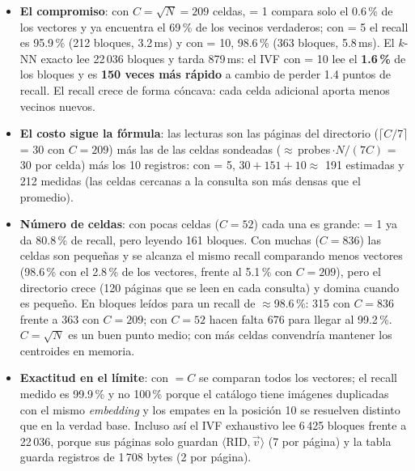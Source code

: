 \begin{itemize}
\item \textbf{El compromiso}: con $C=\sqrt N=209$ celdas,  = 1 compara solo el 0.6\,\%
  de los vectores y ya encuentra el 69\,\% de los vecinos verdaderos; con  = 5 el
  recall es 95.9\,\% (212 bloques, 3.2\,ms) y con  = 10, 98.6\,\% (363 bloques,
  5.8\,ms). El $k$-NN exacto lee 22\,036 bloques y tarda 879\,ms: el IVF con  = 10 lee
  el \textbf{1.6\,\%} de los bloques y es \textbf{150 veces más rápido} a cambio de perder 1.4 puntos
  de recall. El recall crece de forma cóncava: cada celda adicional aporta menos vecinos nuevos.
\item \textbf{El costo sigue la fórmula}: las lecturas son las páginas del directorio
  ($\lceil C/7\rceil$ = 30 con $C=209$) más las de las celdas sondeadas ($\approx$\,probes\,$\cdot
  N/(7C)$ = 30 por celda) más los 10 registros: con  = 5, $30+151+10\approx$ 191
  estimadas y 212 medidas (las celdas cercanas a la consulta son más densas que el promedio).
\item \textbf{Número de celdas}: con pocas celdas ($C=52$) cada una es grande:  = 1 ya
  da 80.8\,\% de recall, pero leyendo 161 bloques. Con muchas ($C=836$) las celdas son pequeñas y se
  alcanza el mismo recall comparando menos vectores (98.6\,\% con el 2.8\,\% de los vectores, frente
  al 5.1\,\% con $C=209$), pero el directorio crece (120 páginas que se leen en cada consulta) y
  domina cuando  es pequeño. En bloques leídos para un recall de $\approx$98.6\,\%:
  315 con $C=836$ frente a 363 con $C=209$; con $C=52$ hacen falta 676 para llegar al 99.2\,\%. $C=\sqrt N$ es un buen punto
  medio; con más celdas convendría mantener los centroides en memoria.
\item \textbf{Exactitud en el límite}: con  $=C$ se comparan todos los vectores; el
  recall medido es 99.9\,\% y no 100\,\% porque el catálogo tiene imágenes duplicadas con el mismo
  \emph{embedding} y los empates en la posición 10 se resuelven distinto que en la verdad base.
  Incluso así el IVF exhaustivo lee 6\,425 bloques frente a 22\,036, porque sus páginas solo guardan
  $\langle\text{RID}, \vec v\rangle$ (7 por página) y la tabla guarda registros de 1\,708 bytes (2 por
  página).
\end{itemize}
